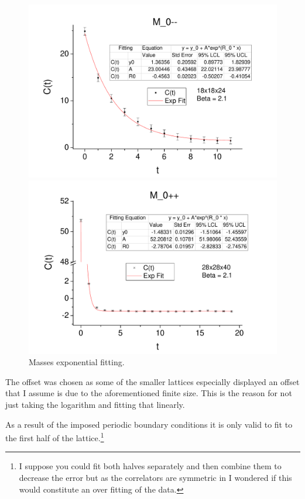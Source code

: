\documentclass[12pt]{article}
\begin{document}
\begin{figure}
  \centering
  \begin{minipage}[c]{\linewidth}
    \includegraphics[width=\linewidth]{m--fit.pdf}
  \end{minipage}
  \begin{minipage}[c]{\linewidth}
    \includegraphics[width=\linewidth]{m++fit.pdf}
  \end{minipage}
\caption{Masses exponential fitting.}
\label{fig:massfitting}
\end{figure}


The offset was chosen as some of the smaller lattices especially displayed an offset that I assume is due to the aforementioned finite size. This is the reason for not just taking the logarithm and fitting that linearly.

\par As a result of the imposed periodic boundary conditions it is only valid to fit to the first half of the lattice.\footnote{I suppose you could fit both halves separately and then combine them to decrease the error but as the correlators are symmetric in I wondered if this would constitute an over fitting of the data.}
\end{document}
